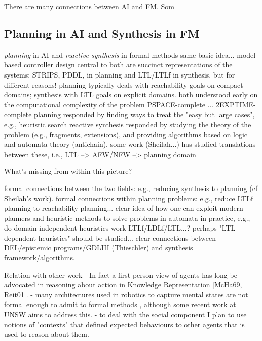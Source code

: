 \documentclass[10pt,a4paper,sans]{moderncv}
\begin{document}
 
%  
% 
% 
% 




There are many connections between AI and FM. Som
\subsection{Planning in AI and Synthesis in FM}

\emph{planning} in AI and \emph{reactive synthesis} in formal methods 
\en
\- same basic idea... model-based controller design
\- central to both are succinct representations of the systems: STRIPS, PDDL, in planning and LTL/LTLf in synthesis.
but for different reasons! planning typically deals with reachability goals on compact domains; synthesis with LTL goals on explicit domains.
\- both understood early on the computational complexity of the problem PSPACE-complete ... 2EXPTIME-complete
\- planning responded by finding ways to treat the "easy but large cases", e.g., heuristic search
\- reactive synthesis responded by studying the theory of the problem (e.g., fragments, extensions), and providing algorithms based on logic and automata theory (antichain).
\- some work (Sheilah...) has studied translations between these, i.e., LTL --> AFW/NFW --> planning domain
\ne

What's missing from within this picture?

\en
\-  formal connections between the two fields: e.g., reducing synthesis to planning (cf Sheilah's work).
\- formal connections within planning problems: e.g., reduce LTLf planning to reachability planning...
\- clear idea of how one can exploit modern planners and heuristic methods to solve problems in automata in practice, e.g., do domain-independent 
heuristics work LTLf/LDLf/LTL...? perhaps "LTL-dependent heuristics" should be studied...
\- clear connections between DEL/epistemic programs/GDLIII (Thieschler) and synthesis framework/algorithms.
\ne

Relation with other work
- In fact a first-person view of agents has long be advocated in reasoning
about action in Knowledge Representation [McHa69, Reit01].
- many architectures used in robotics to capture mental states are not formal enough to admit to formal methods \cite{PeterDunney}, 
although some recent work at UNSW aims to address this.
- to deal with the social component I plan to use notions of "contexts" that defined expected behaviours to other agents that is used to reason 
about them. 
\end{document}
